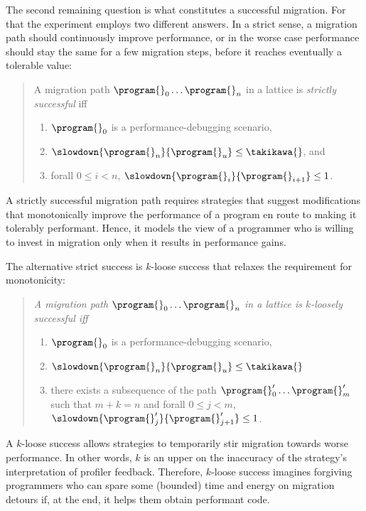 The second remaining question is what constitutes a successful migration.
For that the experiment employs two different answers. In a strict
sense, a migration path should continuously improve performance, or
in the worse case performance should stay the same for a few migration steps, before
it reaches eventually  a tolerable value: 
\begin{quote} \it

A migration path ${\program{}_0} \ldots {\program{}_n}$ in a lattice 
is \emph{strictly successful}
iff 
 \begin{enumerate}
  \item $\program{}_0$ is a performance-debugging scenario,
  \item $\slowdown{\program{}_n}{\program{}_u} \leq \takikawa{}$, and 
  \item forall $0 \leq i < n$, $\slowdown{\program{}_i}{\program{}_{i+1}} \leq 1$.
 \end{enumerate} 
\end{quote}
\noindent A strictly successful migration path requires
strategies that suggest modifications that monotonically improve the
performance of a program en route to making it tolerably performant.
Hence, it models the view of a programmer who is willing to invest in
migration only when it results in performance gains.

The alternative strict success is $k$-loose success that relaxes the
requirement for monotonicity: 
\begin{quote}
\it A migration path ${\program{}_0}
  \ldots {\program{}_n}$ in a lattice 
  is \emph{$k$-loosely successful} iff 
  \begin{enumerate}
  \item  $\program{}_0$ is a performance-debugging scenario,
  \item $\slowdown{\program{}_n}{\program{}_u} \leq \takikawa{}$  
  \item there exists a subsequence of the path 
    ${\program{}^\prime_0} \ldots {\program{}^\prime_m}$ such that
     $m + k = n$ and
      forall $0 \leq j < m$,
      $\slowdown{\program{}^\prime_j}{\program{}^\prime_{j+1}} \leq 1$.
  \end{enumerate} 
\end{quote}
\noindent A $k$-loose success allows strategies to  temporarily stir migration towards
worse performance. In other words, $k$ 
is an upper on the inaccuracy of the strategy's interpretation of
profiler feedback.
Therefore,  $k$-loose success imagines forgiving
programmers who can spare some (bounded) time and energy on migration
detours if,
at the end, it helps them obtain performant code. 





